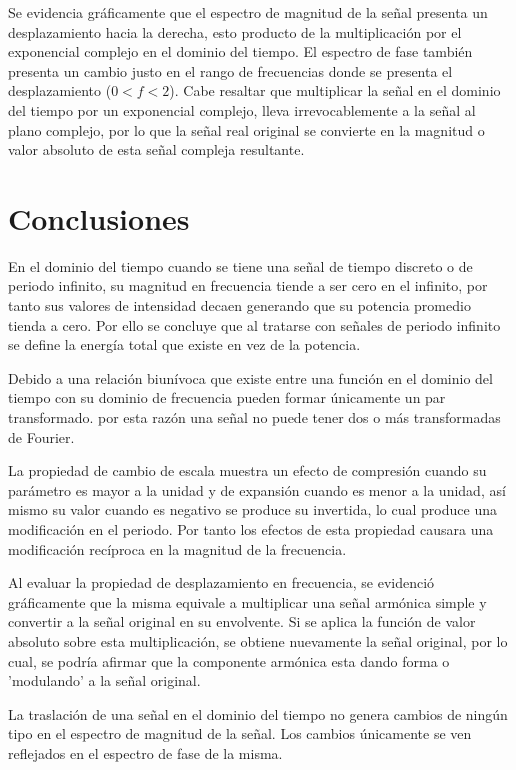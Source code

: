 \documentclass[11pt,letterpaper,twocolumn]{article}
\begin{document}
        Se evidencia gráficamente que el espectro de magnitud de la señal presenta un desplazamiento hacia la derecha, esto producto de la multiplicación por el exponencial complejo en el dominio del tiempo. El espectro de fase también presenta un cambio justo en el rango de frecuencias donde se presenta el desplazamiento ($0<f<2$).
        Cabe resaltar que multiplicar la señal en el dominio del tiempo por un exponencial complejo, lleva irrevocablemente a la señal al plano complejo, por lo que la señal real original se convierte en la magnitud o valor absoluto de esta señal compleja resultante.
            
\section{Conclusiones}
    En el dominio del tiempo cuando se tiene una señal de tiempo discreto o de periodo infinito,
    su magnitud en frecuencia tiende a ser cero en el infinito, por tanto sus valores de 
    intensidad decaen generando que su potencia promedio tienda a cero. Por ello se concluye 
    que al tratarse con señales de periodo infinito se define la energía total que existe en vez 
    de la potencia.
    
    Debido a una relación biunívoca que existe entre una función en el dominio del tiempo con su 
    dominio de frecuencia pueden formar únicamente un par transformado. por esta razón una señal 
    no puede tener dos o más transformadas de Fourier.
    
    La propiedad de cambio de escala muestra un efecto de compresión cuando su parámetro es 
    mayor a la unidad y de expansión cuando es menor a la unidad, así mismo su valor cuando es 
    negativo se produce su invertida, lo cual produce una modificación en el periodo. Por tanto
    los efectos de esta propiedad causara una modificación recíproca en la magnitud de la 
    frecuencia.
    
    Al evaluar la propiedad de desplazamiento en frecuencia, se evidenció gráficamente que la misma equivale a multiplicar una señal armónica simple y convertir a la señal original en su envolvente. Si se aplica la función de valor absoluto sobre esta multiplicación, se obtiene nuevamente la señal original, por lo cual, se podría afirmar que la componente armónica esta dando forma o 'modulando' a la señal original.
    
    La traslación de una señal en el dominio del tiempo no genera cambios de ningún tipo en el espectro de magnitud de la señal. Los cambios únicamente se ven reflejados en el espectro de fase de la misma.
    
\end{document}
